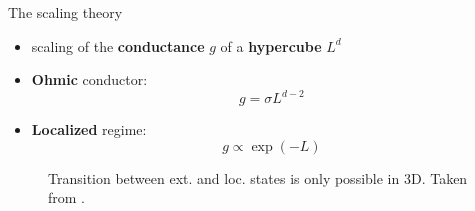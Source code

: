 \documentclass[1pt]{beamer}
\begin{document}
\begin{frame}{The scaling theory  }
\begin{itemize}
\item scaling of the \textbf{conductance} $g$ of 
a \textbf{hypercube} $L^d$ \vspace{3mm} \cite{scaling}
\end{itemize}
\begin{minipage}[c]{0.38\textwidth}
\begin{itemize}
\item \textbf{Ohmic} conductor:
$$g=\sigma L^{d-2}$$
\vspace{5mm}
\item \textbf{Localized} regime:
$$g\propto \exp(-L)$$
\end{itemize}
\end{minipage}\hfill
\begin{minipage}[c]{0.6\textwidth}
\begin{figure}
\caption{Transition between ext. and loc. states is only possible in 3D. Taken from \cite{50yearsof}.}
\end{figure}
\end{minipage}
\end{frame}
\end{document}
